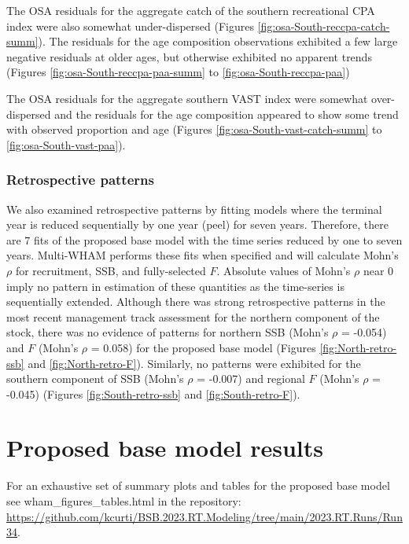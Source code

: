 \documentclass[
]{article}
\begin{document}
The OSA residuals for the aggregate catch of the southern recreational CPA index were also somewhat under-dispersed (Figures \ref{fig:osa-South-reccpa-catch-summ}). The residuals for the age composition observations exhibited a few large negative residuals at older ages, but otherwise exhibited no apparent trends (Figures \ref{fig:osa-South-reccpa-paa-summ} to \ref{fig:osa-South-reccpa-paa})

The OSA residuals for the aggregate southern VAST index were somewhat over-dispersed and the residuals for the age composition appeared to show some trend with observed proportion and age (Figures \ref{fig:osa-South-vast-catch-summ} to \ref{fig:osa-South-vast-paa}).

\hypertarget{retrospective-patterns}{%
\subsubsection{Retrospective patterns}\label{retrospective-patterns}}

We also examined retrospective patterns by fitting models where the terminal year is reduced sequentially by one year (peel) for seven years. Therefore, there are 7 fits of the proposed base model with the time series reduced by one to seven years. Multi-WHAM performs these fits when specified and will calculate Mohn's \(\rho\) for recruitment, SSB, and fully-selected \(F\). Absolute values of Mohn's \(\rho\) near 0 imply no pattern in estimation of these quantities as the time-series is sequentially extended. Although there was strong retrospective patterns in the most recent management track assessment for the northern component of the stock, there was no evidence of patterns for northern SSB (Mohn's \(\rho\) = -0.054) and \(F\) (Mohn's \(\rho\) = 0.058) for the proposed base model (Figures \ref{fig:North-retro-ssb} and \ref{fig:North-retro-F}). Similarly, no patterns were exhibited for the southern component of SSB (Mohn's \(\rho\) = -0.007) and regional \(F\) (Mohn's \(\rho\) = -0.045) (Figures \ref{fig:South-retro-ssb} and \ref{fig:South-retro-F}).

\hypertarget{proposed-base-model-results}{%
\section{Proposed base model results}\label{proposed-base-model-results}}

For an exhaustive set of summary plots and tables for the proposed base model see wham\_figures\_tables.html in the repository: \url{https://github.com/kcurti/BSB.2023.RT.Modeling/tree/main/2023.RT.Runs/Run34}.
\end{document}
